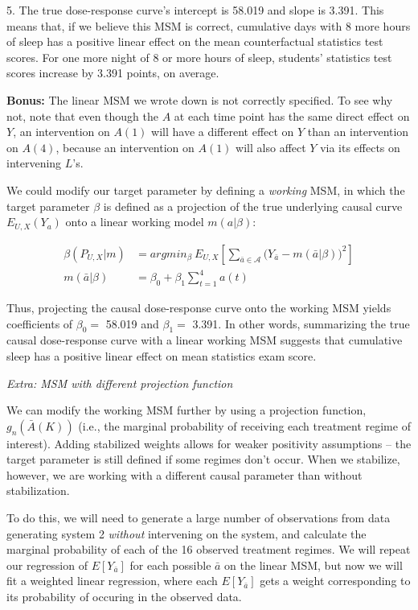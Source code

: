 \documentclass[answers]{exam}
\begin{document}
\begin{solution}
5. The true dose-response curve's intercept is 58.019 and slope is 3.391. This means that, if we believe this MSM is correct, cumulative days with 8 more hours of sleep has a positive linear effect on the mean counterfactual statistics test scores. For one more night of 8 or more hours of sleep, students' statistics test scores increase by 3.391 points, on average.

\vspace{2mm}

\textbf{Bonus:} The linear MSM we wrote down is not correctly specified. To see why not, note that even though the $A$ at each time point has the same direct effect on $Y$, an intervention on $A(1)$ will have a different effect on $Y$ than an intervention on $A(4)$, because an intervention on $A(1)$ will also affect $Y$ via its effects on intervening $L$'s.

We could modify our target parameter by defining a \textit{working} MSM, in which the target parameter $\beta$ is defined as a projection of the true underlying causal curve $E_{U,X}(Y_a)$ onto a linear working model $m(a|\beta)$:

\begin{align*}
\beta(P_{U,X} | m) &= argmin_{\beta} \ E_{U,X}\left[ \sum_{\bar{a}\in \mathcal{A}} \big(Y_{\bar{a}} - m(\bar{a} | \beta)\big)^2 \right] \\
m(\bar{a} |\beta) &= \beta_0 + \beta_1 \sum_{t=1}^4 a(t)
\end{align*}

Thus, projecting the causal dose-response curve onto the working MSM yields coefficients of $\beta_0 = $ 58.019 and $\beta_1= $ 3.391. In other words, summarizing the true causal dose-response curve with a linear working MSM suggests that cumulative sleep has a positive linear effect on mean statistics exam score.

\noindent \textit{Extra: MSM with different projection function}

We can modify the working MSM further by using a projection function, $g_n(\bar{A}(K))$ (i.e., the marginal probability of receiving each treatment regime of interest). Adding stabilized weights allows for weaker positivity assumptions -- the target parameter is still defined if some regimes don't occur. When we stabilize, however, we are working with a different causal parameter than without stabilization.

To do this, we will need to generate a large number of observations from data generating system 2 \textit{without} intervening on the system, and calculate the marginal probability of each of the 16 observed treatment regimes. We will repeat our regression of $E[Y_{\bar{a}}]$ for each possible $\bar{a}$ on the linear MSM, but now we will fit a weighted linear regression, where each $E[Y_{\bar{a}}]$ gets a weight corresponding to its probability of occuring in the observed data.



\end{solution}
\end{document}
